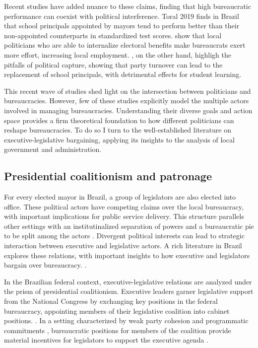 \documentclass[12pt,a4paper]{article}
\begin{document}
Recent studies have added nuance to these claims, finding that high bureaucratic performance can coexist with political interference. Toral 2019 finds in Brazil that school principals appointed by mayors tend to perform better than their non-appointed counterparts in standardized test scores. \citet{gulzar_politicians_2017} show that local politicians who are able to internalize electoral benefits make bureaucrats exert more effort, increasing local employment. \citet{akhtari_political_2015}, on the other hand, highligh the pitfalls of political capture, showing that party turnover can lead to the replacement of school principals, with detrimental effects for student learning.

This recent wave of studies shed light on the intersection between politicians and bureaucracies. However, few of these studies explicitly model the multiple actors involved in managing bureaucracies. Understanding their diverse goals and action space provides a firm theoretical foundation to how different politicians can reshape bureaucracies. To do so I turn to the well-established literature on executive-legislative bargaining, applying its insights to the analysis of local government and administration.

\subsection*{Presidential coalitionism and patronage}

For every elected mayor in Brazil, a group of legislators are also elected into office. These political actors have competing claims over the local bureaucracy, with important implications for public service delivery. This structure parallels other settings with an institutinalized separation of powers and a bureaucratic pie to be split among the actors \citep{grindle_jobs_2012, mccarty_appointments_2004}. Divergent political interests can lead to strategic interaction between executive and legislative actors. A rich literature in Brazil explores these relations, with important insights to how executive and legislators bargain over bureaucracy. \citet{raile_executive_2011, power_optimism_2010}. 

In the Brazilian federal context, executive-legislative relations are analyzed under the prism of presidential coalitionism. Executive leaders garner legislative support from the National Congress by exchanging key positions in the federal bureaucracy, appointing members of their legislative coalition into cabinet positions. \citep{raile_executive_2011}. In a setting characterized by weak party cohesion and programmatic commitments \citet{ames_electoral_1995, lucas_ideological_2010}, bureaucratic positions for members of the coalition provide material incentives for legislators to support the executive agenda \citet{batista_o_2013, neto_presidential_2006, figueiredo_executivo_1999}.
\end{document}

